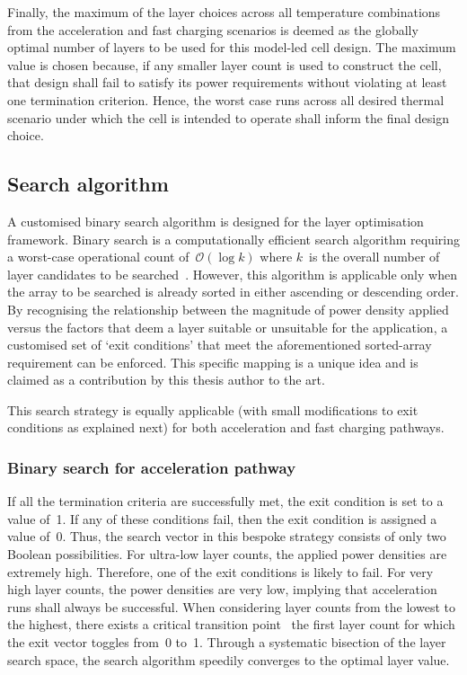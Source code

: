 Finally, the  maximum of the  layer choices across all  temperature combinations
from the  acceleration and  fast charging  scenarios is  deemed as  the globally
optimal  number of  layers  to be  used  for this  model-led  cell design. The
maximum value is chosen because, if any smaller layer count is used to construct
the cell, that design shall fail to satisfy its power requirements without
violating at least one termination criterion. Hence, the worst case runs across
all desired thermal scenario under which the cell is intended to operate shall
inform the final design choice.


\subsection{Search algorithm}\label{sec:searchalgo}

A  customised binary  search algorithm  is designed  for the  layer optimisation
framework.  Binary  search  is  a  computationally  efficient  search  algorithm
requiring a worst-case  operational count of~$\mathcal{O}(\log k)$  where $k$~is
the  overall  number  of  layer  candidates  to  be  searched~\cite{Cormen2009}.
However, this  algorithm is  applicable only  when the array  to be  searched is
already  sorted in  either ascending  or  descending order.  By recognising  the
relationship between the  magnitude of power density applied  versus the factors
that deem a  layer suitable or unsuitable for the  application, a customised set
of `exit conditions'  that meet the aforementioned  sorted-array requirement can
be  enforced. This  specific  mapping is  a  unique  idea and  is  claimed as  a
contribution by this thesis author to the art.

This search  strategy is  equally applicable (with  small modifications  to exit
conditions as explained next) for both acceleration and fast charging pathways.

\subsubsection*{Binary search for acceleration pathway}

If all the termination criteria are  successfully met, the exit condition is set
to a  value of~1. If any  of these conditions  fail, then the exit  condition is
assigned a value of~0. Thus, the search vector in this bespoke strategy consists
of only two Boolean possibilities. For ultra-low layer counts, the applied power
densities are extremely high. Therefore, one of the exit conditions is likely to
fail. For  very high layer  counts, the power  densities are very  low, implying
that acceleration runs shall always be successful. When considering layer counts
from  the lowest  to  the  highest, there  exists  a  critical transition  point
\viz~the  first layer  count  for which  the exit  vector  toggles from~0  to~1.
Through a systematic  bisection of the layer search space,  the search algorithm
speedily converges to the optimal layer value.

